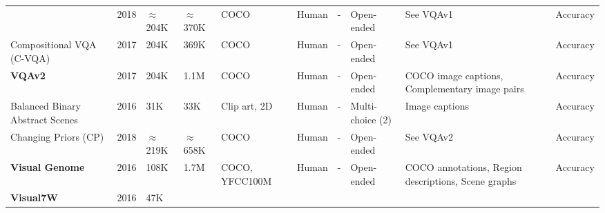 \begin{landscape}
\begin{footnotesize}
\begin{center}
\begin{xltabular}{\linewidth}{LlllLLLLLL}
          & 2018
          & {\color{red}\(\approx\)204K}  %
          & {\color{red}\(\approx\)370K}  %
          & COCO
          & Human
          & -
          & Open-ended
          & See VQAv1
          & Accuracy\footnotemark[\value{footnote}] \\
          Compositional VQA (C-VQA) \cite{agrawal2017cvqa}
          & 2017
          & 204K  %
          & 369K  %
          & COCO
          & Human
          & -
          & Open-ended
          & See VQAv1
          & Accuracy\footnotemark[\value{footnote}] \\
          \textbf{VQAv2} \cite{goyal2017making}
          & 2017
          & 204K  %
          & 1.1M  %
          & COCO
          & Human
          & -
          & Open-ended
          & COCO image captions, Complementary image pairs
          & Accuracy\footnotemark[\value{footnote}] \\
          Balanced Binary Abstract Scenes \cite{zhang2016yin}
          & 2016
          & 31K %
          & 33K %
          & Clip art, 2D
          & Human
          & -
          & Multi-choice (2)
          & Image captions
          & Accuracy\footnotemark[\value{footnote}] \\
          Changing Priors (CP) \cite{agrawal2018dont}
          & 2018
          & {\color{red}\(\approx\)219K}  %
          & {\color{red}\(\approx\)658K}  %
          & COCO
          & Human
          & -
          & Open-ended
          & See VQAv2
          & Accuracy\footnotemark[\value{footnote}] \\
          \textbf{Visual Genome} \cite{krishna2017visual}
          & 2016
          & 108K  %
          & 1.7M  %
          & COCO, YFCC100M \cite{thomee2016yfcc100m}
          & Human
          & -
          & Open-ended
          & COCO annotations, Region descriptions, Scene graphs
          & Accuracy \\
          \textbf{Visual7W} \cite{zhu2016visual7w}
          & 2016
          & 47K %

\end{xltabular}
\end{center}
\end{footnotesize}
\end{landscape}
